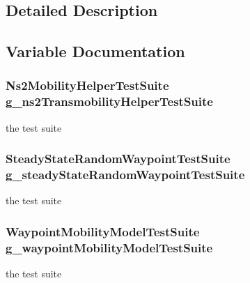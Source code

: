 \subsection{Detailed Description}


\subsection{Variable Documentation}
\subsubsection[{\texorpdfstring{g\+\_\+ns2\+Transmobility\+Helper\+Test\+Suite}{g_ns2TransmobilityHelperTestSuite}}]{\setlength{\rightskip}{0pt plus 5cm} {\bf Ns2\+Mobility\+Helper\+Test\+Suite}  g\+\_\+ns2\+Transmobility\+Helper\+Test\+Suite}\hypertarget{group__mobility-test_ga9cf266ce06398660390512f30445f1cd}{}\label{group__mobility-test_ga9cf266ce06398660390512f30445f1cd}


the test suite 

\subsubsection[{\texorpdfstring{g\+\_\+steady\+State\+Random\+Waypoint\+Test\+Suite}{g_steadyStateRandomWaypointTestSuite}}]{\setlength{\rightskip}{0pt plus 5cm} {\bf Steady\+State\+Random\+Waypoint\+Test\+Suite}  g\+\_\+steady\+State\+Random\+Waypoint\+Test\+Suite}\hypertarget{group__mobility-test_ga14b35555884e80f253fef7a55c5b5c21}{}\label{group__mobility-test_ga14b35555884e80f253fef7a55c5b5c21}


the test suite 

\subsubsection[{\texorpdfstring{g\+\_\+waypoint\+Mobility\+Model\+Test\+Suite}{g_waypointMobilityModelTestSuite}}]{\setlength{\rightskip}{0pt plus 5cm} {\bf Waypoint\+Mobility\+Model\+Test\+Suite}  g\+\_\+waypoint\+Mobility\+Model\+Test\+Suite\hspace{0.3cm}{\ttfamily [static]}}\hypertarget{group__mobility-test_ga98c7d90d165c941d567251f6ae314ea0}{}\label{group__mobility-test_ga98c7d90d165c941d567251f6ae314ea0}


the test suite 

